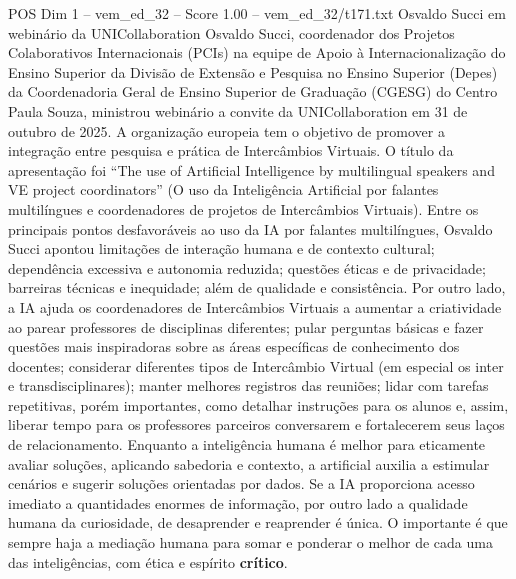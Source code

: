 \begin{textsample}{POS Dim 1 – vem\_ed\_32 – Score 1.00 – vem\_ed\_32/t171.txt}  \label{ex:f1_pos_058}
Osvaldo Succi em webinário da UNICollaboration Osvaldo Succi, coordenador dos Projetos Colaborativos Internacionais (PCIs) na equipe de Apoio à Internacionalização do Ensino Superior da Divisão de Extensão e Pesquisa no Ensino Superior (Depes) da Coordenadoria Geral de Ensino Superior de Graduação (CGESG) do Centro Paula Souza, ministrou webinário a convite da UNICollaboration em 31 de outubro de 2025.
A organização europeia tem o objetivo de promover a integração entre pesquisa e prática de Intercâmbios Virtuais.
O título da apresentação foi “The use of Artificial Intelligence by multilingual speakers and VE project coordinators” (O uso da Inteligência Artificial por falantes multilíngues e coordenadores de projetos de Intercâmbios Virtuais).
Entre os principais pontos desfavoráveis ao uso da IA por falantes multilíngues, Osvaldo Succi apontou limitações de interação humana e de contexto cultural; dependência excessiva e autonomia reduzida; questões éticas e de privacidade; barreiras técnicas e inequidade; além de qualidade e consistência.
Por outro lado, a IA ajuda os coordenadores de Intercâmbios Virtuais a aumentar a criatividade ao parear professores de disciplinas diferentes; pular perguntas básicas e fazer questões mais inspiradoras sobre as áreas específicas de conhecimento dos docentes; considerar diferentes tipos de Intercâmbio Virtual (em especial os inter e transdisciplinares); manter melhores registros das reuniões; lidar com tarefas repetitivas, porém importantes, como detalhar instruções para os alunos e, assim, liberar tempo para os professores parceiros conversarem e fortalecerem seus laços de relacionamento.
Enquanto a inteligência humana é melhor para eticamente avaliar soluções, aplicando sabedoria e contexto, a artificial auxilia a estimular cenários e sugerir soluções orientadas por dados.
Se a IA proporciona acesso imediato a quantidades enormes de informação, por outro lado a qualidade humana da curiosidade, de desaprender e reaprender é única.
O importante é que sempre haja a mediação humana para somar e ponderar o melhor de cada uma das inteligências, com ética e espírito \textbf{crítico}.

\end{textsample}

